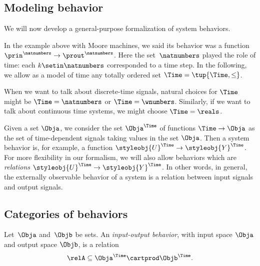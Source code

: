 \subsection{Modeling behavior}

We will now develop a general-purpose formalization of system behaviors.

In the example above with Moore machines, we said its behavior was a function $\prin^\natnumbers \to \prout^\natnumbers$.
Here the set~$\natnumbers$ played the role of time: each $k \setin \natnumbers$ corresponded to a time step.
In the following, we allow as a model of time any totally ordered set $\Time = \tup{\Time, \leq}$.

When we want to talk about discrete-time signals, natural choices for $\Time$ might be $\Time = \natnumbers$ or $\Time = \wnumbers$.
Similarly, if we want to talk about continuous time systems, we might choose $\Time = \reals$.

Given a set $\Obja$, we consider the set $\Obja^\Time$ of functions $\Time \to \Obja$ as the set of time-dependent signals taking values in the set $\Obja$.
Then a system behavior is, for example, a function $\styleobj{U}^\Time \to \styleobj{Y}^\Time$.
For more flexibility in our formalism, we will also allow behaviors which are \emph{relations} $\styleobj{U}^\Time \to \styleobj{Y}^\Time$.
In other words, in general, the externally observable behavior of a system is a relation between input signals and output signals.

\subsection{Categories of behaviors}

\begin{definition}
    Let~$\Obja$ and~$\Objb$ be sets.
    An \emph{input-output behavior}, with input space $\Obja$ and output space $\Objb$, is a relation
    \begin{equation*}
        \relA \subseteq \Obja^\Time \cartprod \Objb^\Time.
    \end{equation*}
\end{definition}

